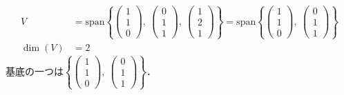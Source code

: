 \begin{ans}
\begin{align*}
V&=\text{span}\left\{\begin{pmatrix}1 \\ 1 \\ 0\end{pmatrix},\ \begin{pmatrix}0 \\ 1 \\ 1\end{pmatrix},\ \begin{pmatrix}1 \\ 2 \\ 1\end{pmatrix}\right\}=\text{span}\left\{\begin{pmatrix}1 \\ 1 \\ 0\end{pmatrix},\ \begin{pmatrix}0 \\ 1 \\ 1\end{pmatrix}\right\}\\
\dim(V)&=2
\end{align*}
基底の一つは$\left\{\begin{pmatrix}1 \\ 1 \\ 0\end{pmatrix},\ \begin{pmatrix}0 \\ 1 \\ 1\end{pmatrix}\right\}$．
\end{ans}

